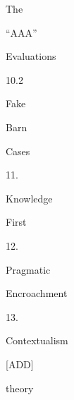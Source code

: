 \documentclass[varwidth]{standalone}
\begin{document}
\begin{CJK*}{UTF8}{gbsn}
{{{\colorbox{RoyalPurple!0.0}{\strut The} \colorbox{RoyalPurple!0.0}{\strut “AAA”} \colorbox{RoyalPurple!0.0}{\strut Evaluations} \colorbox{RoyalPurple!0.0}{\strut 10.2} \colorbox{RoyalPurple!0.0}{\strut Fake} \colorbox{RoyalPurple!0.0}{\strut Barn} \colorbox{RoyalPurple!2.54761315878398}{\strut Cases} \colorbox{RoyalPurple!0.0}{\strut 11.} \colorbox{RoyalPurple!23.52139008898187}{\strut Knowledge} \colorbox{RoyalPurple!28.934129550023513}{\strut First} \colorbox{RoyalPurple!0.0}{\strut 12.} \colorbox{RoyalPurple!0.0}{\strut Pragmatic} \colorbox{RoyalPurple!0.0}{\strut Encroachment} \colorbox{RoyalPurple!0.0}{\strut 13.} \colorbox{RoyalPurple!0.0}{\strut Contextualism} \colorbox{RoyalPurple!0.0}{\strut [ADD]} \colorbox{RoyalPurple!37.04628550538828}{\strut theory} 
}}}
\end{CJK*}
\end{document}
